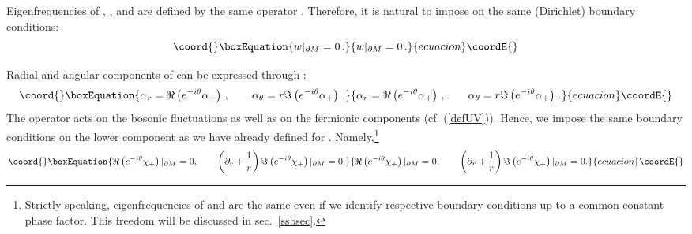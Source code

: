\documentclass[a4paper,12pt]{article}
\begin{document}
Eigenfrequencies of \myHighlight{$\sigma$}\coordHE{}, \coordHE{}, and \coordHE{} are defined by
the same operator \coordHE{}. Therefore, it is natural to impose
on \coordHE{} the same (Dirichlet) boundary conditions:
\begin{equation}\coord{}\boxEquation{
w|_{\partial M}=0 \,.\label{bcw}
}{
w|_{\partial M}=0 \,.}{ecuacion}\coordE{}\end{equation}  

Radial and angular components of \myHighlight{$\alpha$}\coordHE{} can be expressed through
\myHighlight{$\alpha_+$}\coordHE{}:
\begin{equation}\coord{}\boxEquation{
\alpha_r =\Re \left( e^{-i\theta} \alpha_+ \right)\,,\qquad
\alpha_\theta = r \Im \left( e^{-i\theta }\alpha_+ \right)\,.
\label{rthetaplus}
}{
\alpha_r =\Re \left( e^{-i\theta} \alpha_+ \right)\,,\qquad
\alpha_\theta = r \Im \left( e^{-i\theta }\alpha_+ \right)\,.
}{ecuacion}\coordE{}\end{equation}
The operator \coordHE{} acts on the bosonic fluctuations
\coordHE{} as well as on the fermionic components
\coordHE{} (cf. (\ref{defUV})). Hence, we impose the same boundary 
conditions on the lower component \coordHE{} as we have already
defined for \coordHE{}. Namely,\footnote{\label{ft}Strictly 
speaking, eigenfrequencies of \coordHE{}
and \coordHE{} are the same even if we identify respective
boundary conditions up to a common constant phase factor. 
This freedom will be discussed in sec.\ \ref{ssbsec}.}
\begin{equation}\coord{}\boxEquation{
\Re \left( e^{-i\theta} \chi_+ \right) |_{\partial M}=0,
\qquad \left( \partial_r +\frac 1r \right) \Im
\left( e^{-i\theta} \chi_+ \right) |_{\partial M}=0.
\label{bcchip}
}{
\Re \left( e^{-i\theta} \chi_+ \right) |_{\partial M}=0,
\qquad \left( \partial_r +\frac 1r \right) \Im
\left( e^{-i\theta} \chi_+ \right) |_{\partial M}=0.
}{ecuacion}\coordE{}\end{equation}
\end{document}

